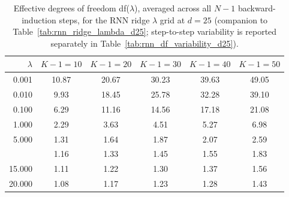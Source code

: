 \begin{table}

\caption{\label{tab:rnn_ridge_lambda_df_d25}Effective degrees of freedom df($\lambda$), averaged across all $N-1$ backward-induction steps, for the RNN ridge $\lambda$ grid at $d=25$ (companion to Table~\ref{tab:rnn_ridge_lambda_d25}; step-to-step variability is reported separately in Table~\ref{tab:rnn_df_variability_d25}).}
\footnotesize
\setlength{\tabcolsep}{4pt}
\centering
\begin{tabular}[t]{rccccc}
\toprule
$\lambda$ & $K-1=10$ & $K-1=20$ & $K-1=30$ & $K-1=40$ & $K-1=50$\\
\midrule
0.001 & 10.87 & 20.67 & 30.23 & 39.63 & 49.05\\
0.010 & 9.93 & 18.45 & 25.78 & 32.28 & 39.10\\
0.100 & 6.29 & 11.16 & 14.56 & 17.18 & 21.08\\
1.000 & 2.29 & 3.63 & 4.51 & 5.27 & 6.98\\
5.000 & 1.31 & 1.64 & 1.87 & 2.07 & 2.59\\
\addlinespace
10.000 & 1.16 & 1.33 & 1.45 & 1.55 & 1.83\\
15.000 & 1.11 & 1.22 & 1.30 & 1.37 & 1.56\\
20.000 & 1.08 & 1.17 & 1.23 & 1.28 & 1.43\\
\bottomrule
\end{tabular}
\end{table}
